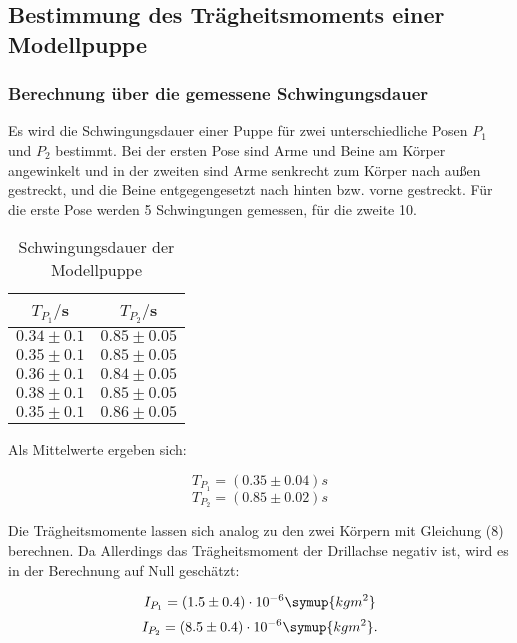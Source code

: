 \subsection{Bestimmung des Trägheitsmoments einer Modellpuppe}
\subsubsection{Berechnung über die gemessene Schwingungsdauer}
Es wird die Schwingungsdauer einer Puppe für zwei unterschiedliche 
Posen $P_\text{1}$ und $P_\text{2}$ bestimmt. Bei der ersten Pose sind Arme und Beine am Körper angewinkelt und in der zweiten
sind Arme senkrecht zum Körper nach außen gestreckt, und die Beine entgegengesetzt nach hinten bzw. vorne gestreckt.
Für die erste Pose werden 5 Schwingungen gemessen, für die zweite 10.
\begin{table}[H]
  \centering
  \caption{Schwingungsdauer der Modellpuppe}
  \label{tab:Schwingungsdauer der Modellpuppe}
  \begin{tabular}{c c}
    \toprule
    $T_{P_1}/$s & $T_{P_2}/$s \\
    \midrule
    $0.34 \pm 0.1$ & $0.85 \pm 0.05$ \\
    $0.35 \pm 0.1$ & $0.85 \pm 0.05$ \\
    $0.36 \pm 0.1$ & $0.84 \pm 0.05$ \\
    $0.38 \pm 0.1$ & $0.85 \pm 0.05$ \\
    $0.35 \pm 0.1$ & $0.86 \pm 0.05$ \\
    \bottomrule
  \end{tabular}
\end{table}

Als Mittelwerte ergeben sich:

\begin{equation}
T_{P_1} = (0.35 \pm 0.04) s
\end{equation}
\begin{equation}
T_{P_2}= (0.85 \pm 0.02) s
\end{equation}

Die Trägheitsmomente lassen sich analog zu den zwei Körpern mit Gleichung (8) berechnen.
Da Allerdings das Trägheitsmoment der Drillachse negativ ist, wird es in der Berechnung auf Null geschätzt:

\begin{equation}
I_{P_1}  = (1.5 \pm 0.4)\cdot 10^{-6} \symup{kgm^2} 
\end{equation}
\begin{equation}
I_{P_2}  = (8.5 \pm 0.4)\cdot 10^{-6} \symup{kgm^2} .
\end{equation}

